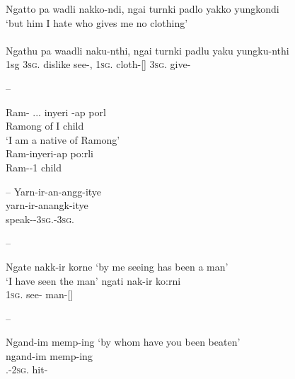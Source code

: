 \documentclass{langscibook}
\begin{document}
\begin{xlist}
\ea\label{ex:5:35}
Ngatto  pa           wadli    nakko-ndi,     ngai         turnki             padlo       yakko      yungkondi \\
\glt `but him I hate who gives me no clothing' \\
\citep[13]{teichelmann_outlines_1840} \\
\gll Ngathu    pa           waadli	 naku-nthi,     ngai         turnki             padlu       yaku    yungku-nthi \\
1sg 3\textsc{sg}.  dislike    see-,   1\textsc{sg}.   cloth-[]  3\textsc{sg}.      give-                                \\
\z




--
\ea\label{ex:key:36}
\begin{xlist}
	\ex
	\gll Ram- ... inyeri -ap     porl \\
	Ramong  {}   of       I       child \\
	\glt  `I am a native of Ramong' \\
	\citep[63]{meyer_vocabulary_1843}
	\ex 
	\gll Ram-inyeri-ap        po:rli\\
	Ram--1       child \\
\end{xlist}
\z
--
\ea \label{ex:key:37}
\glll Yarn-ir-an-angg-itye \\
yarn-ir-anangk-itye \\
speak--3\textsc{sg}.-3\textsc{sg}.\footnotemark \\

\z

--
\ea\label{ex:key:38}
\begin{xlist}
	\ex Ngate nakk-ir korne
	\glt `by me seeing has been a man' \\
	\citep[33]{meyer_vocabulary_1843}
	\glt `I have seen the man'
	\ex
	\gll ngati nak-ir ko:rni \\
	1\textsc{sg}.   see-   man-[] \\
\end{xlist}
\z
--
\ea\label{ex:key:39}
\begin{xlist}
	\ex Ngand-im memp-ing 
	\glt `by whom have you been beaten' \\
	\citep[33]{meyer_vocabulary_1843}
	\ex
	\gll  ngand-im memp-ing\\
	.-2\textsc{sg}. hit- \\
\end{xlist}
\z


\end{xlist}
\end{document}
